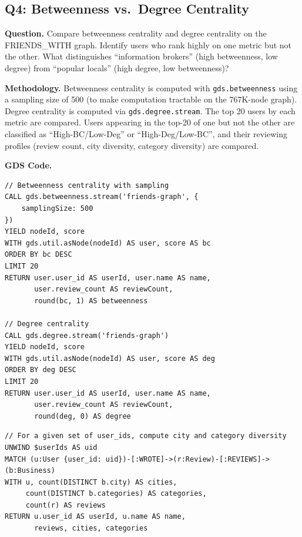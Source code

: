 \documentclass[11pt]{article}
\begin{document}
\clearpage
\subsection{Q4: Betweenness vs.\ Degree Centrality}

\textbf{Question.} Compare betweenness centrality and degree centrality on the FRIENDS\_WITH graph. Identify users who rank highly on one metric but not the other. What distinguishes ``information brokers'' (high betweenness, low degree) from ``popular locals'' (high degree, low betweenness)?

\textbf{Methodology.} Betweenness centrality is computed with \texttt{gds.betweenness} using a sampling size of 500 (to make computation tractable on the 767K-node graph). Degree centrality is computed via \texttt{gds.degree.stream}. The top 20 users by each metric are compared. Users appearing in the top-20 of one but not the other are classified as ``High-BC/Low-Deg'' or ``High-Deg/Low-BC'', and their reviewing profiles (review count, city diversity, category diversity) are compared.

\textbf{GDS Code.}
\begin{lstlisting}[style=cypher, caption={Betweenness and degree centrality comparison.}, label={lst:gds-q4}]
// Betweenness centrality with sampling
CALL gds.betweenness.stream('friends-graph', {
    samplingSize: 500
})
YIELD nodeId, score
WITH gds.util.asNode(nodeId) AS user, score AS bc
ORDER BY bc DESC
LIMIT 20
RETURN user.user_id AS userId, user.name AS name,
       user.review_count AS reviewCount,
       round(bc, 1) AS betweenness

// Degree centrality
CALL gds.degree.stream('friends-graph')
YIELD nodeId, score
WITH gds.util.asNode(nodeId) AS user, score AS deg
ORDER BY deg DESC
LIMIT 20
RETURN user.user_id AS userId, user.name AS name,
       user.review_count AS reviewCount,
       round(deg, 0) AS degree
\end{lstlisting}

\begin{lstlisting}[style=cypher, caption={Profiling divergent users: city and category diversity.}, label={lst:gds-q4-profile}]
// For a given set of user_ids, compute city and category diversity
UNWIND $userIds AS uid
MATCH (u:User {user_id: uid})-[:WROTE]->(r:Review)-[:REVIEWS]->(b:Business)
WITH u, count(DISTINCT b.city) AS cities,
     count(DISTINCT b.categories) AS categories,
     count(r) AS reviews
RETURN u.user_id AS userId, u.name AS name,
       reviews, cities, categories
\end{lstlisting}
\end{document}

